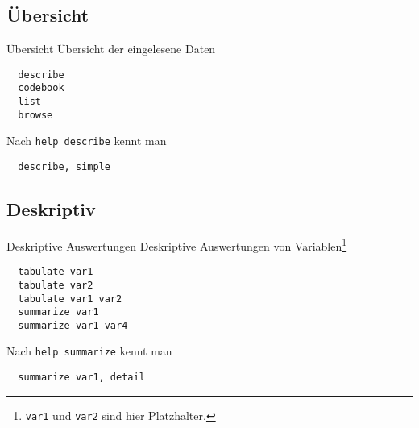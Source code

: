 \subsection{Übersicht}
\begin{frame}[fragile]{Übersicht}
Übersicht der eingelesene Daten      

  \begin{lstlisting}
  describe
  codebook
  list
  browse
  \end{lstlisting}
  
Nach \texttt{help describe} kennt man
  \begin{lstlisting}
  describe, simple
  \end{lstlisting}
  

\end{frame}

\subsection{Deskriptiv}
\begin{frame}[fragile]{Deskriptive Auswertungen}
Deskriptive Auswertungen von Variablen\footnote{\texttt{var1} und \texttt{var2} sind hier Platzhalter.}

  
  \begin{lstlisting}
  tabulate var1
  tabulate var2
  tabulate var1 var2
  summarize var1
  summarize var1-var4
  \end{lstlisting}

Nach \texttt{help summarize} kennt man
  \begin{lstlisting}
  summarize var1, detail
  \end{lstlisting}

\end{frame}